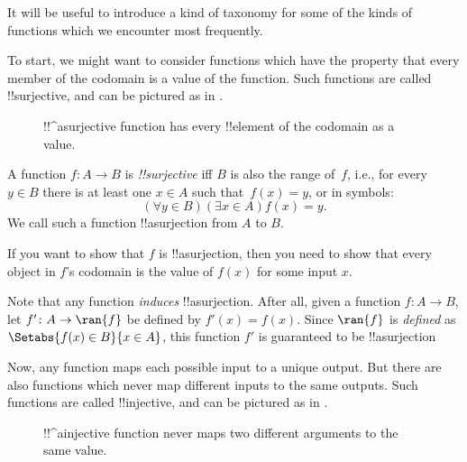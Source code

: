 \documentclass[../../../include/open-logic-section]{subfiles}
\begin{document}

\begin{explain}
It will be useful to introduce a kind of taxonomy for some of the
kinds of functions which we encounter most frequently. 

To start, we might want to consider functions which have the property
that every member of the codomain is a value of the function. Such
functions are called !!{surjective}, and can be pictured as in
.

\begin{figure}
  \caption{!!^a{surjective} function has every !!{element} of the
    codomain as a value.}
\end{figure}
\end{explain}

\begin{defn}
A function $f \colon A \rightarrow B$ is \emph{!!{surjective}} iff $B$
is also the range of~$f$, i.e., for every $y \in B$ there is at least
one $x \in A$ such that~$f(x) = y$, or in symbols:
\[
  (\forall y \in B)(\exists x \in A)f(x) = y.
\]
We call such a function !!a{surjection} from $A$ to $B$.
\end{defn}

\begin{explain}
If you want to show that $f$ is !!a{surjection}, then you need to show
that every object in $f$'s codomain is the value of $f(x)$ for some
input $x$.

Note that any function \emph{induces} !!a{surjection}. After all,
given a function $f \colon A \to B$, let $f' \colon A \to \ran{f}$ be
defined by $f'(x) = f(x)$. Since $\ran{f}$ is \emph{defined} as
$\Setabs{f(x) \in B}{x \in A}$, this function $f'$ is guaranteed to be
!!a{surjection}
\end{explain}

\begin{explain}
Now, any function maps each possible input to a unique output. But
there are also functions which never map different inputs to the same
outputs. Such functions are called !!{injective}, and can be pictured
as in .
\begin{figure}
  \caption{!!^a{injective} function never maps two different
    arguments to the same value.}
\end{figure}
\end{explain}
\end{document}
